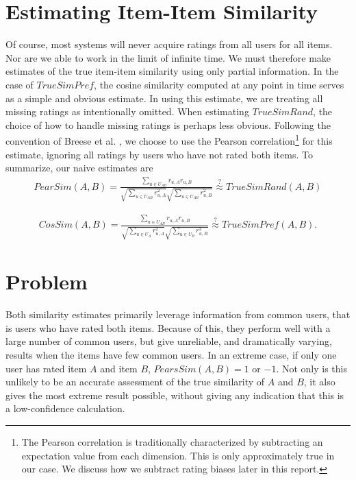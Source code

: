 \documentclass[11pt]{article}
\begin{document}
\section*{Estimating Item-Item Similarity}

Of course, most systems will never acquire ratings from all users for all items.
Nor are we able to work in the limit of infinite time. We must therefore make
estimates of the true item-item similarity using only partial information. In
the case of $TrueSimPref$, the cosine similarity computed at any point in time
serves as a simple and obvious estimate. In using this estimate, we are treating
all missing ratings as intentionally omitted. When estimating $TrueSimRand$, the
choice of how to handle missing ratings is perhaps less obvious. Following the
convention of Breese et al. \cite{Breese1998}, we choose to use the Pearson
correlation\footnote{The Pearson correlation is traditionally characterized by
subtracting an expectation value from each dimension. This is only approximately
true in our case. We discuss how we subtract rating biases later in this
report.} for this estimate, ignoring all ratings by users who have not rated
both items. To summarize, our naive estimates are
\begin{align}
PearSim(A, B) = \frac{\sum\limits_{u\in U_{AB}}
r_{u,A}r_{u,B}}{\sqrt{\sum\limits_{u\in U_{AB}} r_{u,A}^2}
\sqrt{\sum\limits_{u\in U_{AB}} r_{u,B}^2}}
\stackrel{?}{\approx} TrueSimRand(A, B)
\end{align}

\begin{align}
CosSim(A, B) = \frac{\sum\limits_{u\in U_{AB}}
r_{u,A}r_{u,B}}{\sqrt{\sum\limits_{u\in U_A} r_{u,A}^2}
\sqrt{\sum\limits_{u\in U_B} r_{u,B}^2}}
\stackrel{?}{\approx} TrueSimPref(A, B).
\end{align}

\section*{Problem}
Both similarity estimates primarily leverage information from common users, that
is users who have rated both items. Because of this, they perform well with a
large number of common users, but give unreliable, and dramatically varying,
results when the items have few common users. In an extreme case, if only one
user has rated item $A$ and item $B$, $PearsSim(A, B) = 1$ or $-1$. Not only is
this unlikely to be an accurate assessment of the true similarity of $A$ and
$B$, it also gives the most extreme result possible, without giving any
indication that this is a low-confidence calculation.
\end{document}

